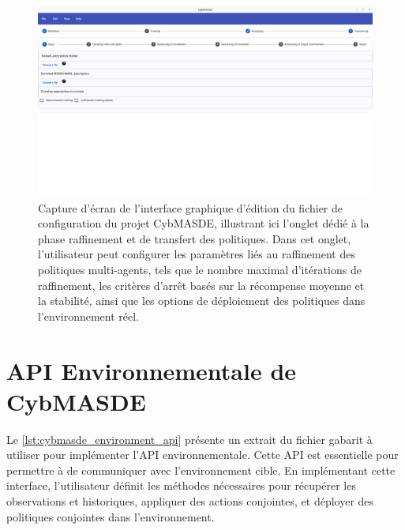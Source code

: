 \begin{figure}[h!]
       \centering
       \includegraphics[trim=0cm 15cm 0cm 0cm, clip,width=\linewidth]{figures/refining.png}
       \caption{Capture d'écran de l'interface graphique d'édition du fichier de configuration du projet CybMASDE, illustrant ici l'onglet dédié à la phase raffinement et de transfert des politiques. Dans cet onglet, l'utilisateur peut configurer les paramètres liés au raffinement des politiques multi-agents, tels que le nombre maximal d'itérations de raffinement, les critères d'arrêt basés sur la récompense moyenne et la stabilité, ainsi que les options de déploiement des politiques dans l'environnement réel.}
       \label{fig:cybmasde_refining_screenshot}
\end{figure}

\clearpage

\section{API Environnementale de CybMASDE}\label{appendix:cybmasde-environment-api}

Le \autoref{lst:cybmasde_environment_api} présente un extrait du fichier gabarit à utiliser pour implémenter l'API environnementale. Cette API est essentielle pour permettre à  de communiquer avec l'environnement cible. En implémentant cette interface, l'utilisateur définit les méthodes nécessaires pour récupérer les observations et historiques, appliquer des actions conjointes, et déployer des politiques conjointes dans l'environnement.

